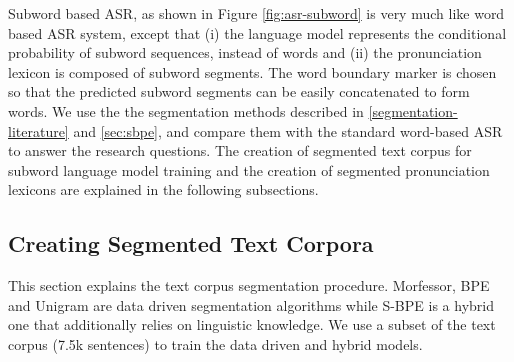 Subword based ASR, as shown in Figure \ref{fig:asr-subword} is very much like word
based ASR system, except that (i) the language model represents the conditional
probability of subword sequences, instead of words and (ii) the pronunciation
lexicon is composed of subword segments. The word boundary marker is chosen so
that the predicted subword segments can be easily concatenated to form words.
We use the the segmentation methods described in \ref{segmentation-literature}
and \ref{sec:sbpe}, and compare them with the standard word-based ASR to answer
the research questions. The creation of segmented text corpus for subword
language model training and the creation of segmented pronunciation lexicons
are explained in the following subsections.


\subsection{Creating Segmented Text Corpora}



This section explains the text corpus segmentation procedure. Morfessor, BPE
and Unigram are data driven segmentation algorithms while S-BPE is a hybrid one
that additionally relies on linguistic knowledge. We use a subset of the text
corpus (7.5k sentences) to train the data driven and hybrid models.

